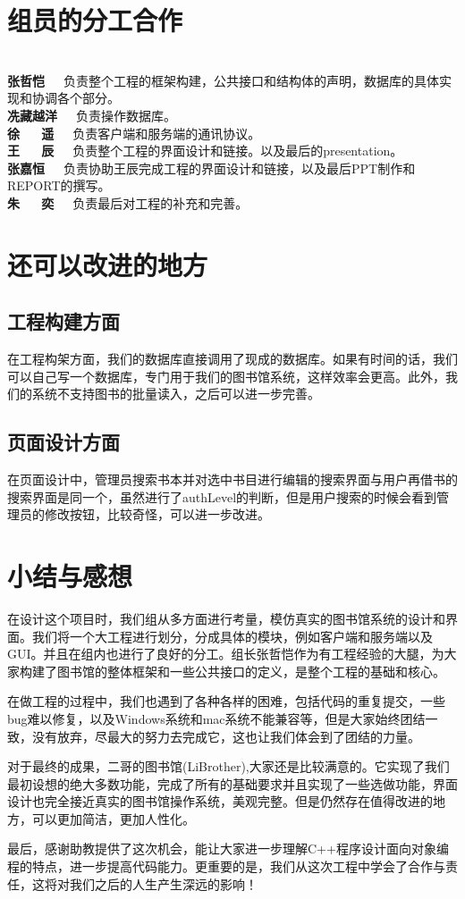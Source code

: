 \documentclass[UTF8]{ctexart}
\begin{document}
\section{组员的分工合作}
\\
\textbf{张哲恺}~~~负责整个工程的框架构建，公共接口和结构体的声明，数据库的具体实现和协调各个部分。\\
\textbf{冼藏越洋}~~~负责操作数据库。\\
\textbf{徐~~~遥}~~~负责客户端和服务端的通讯协议。\\
\textbf{王~~~辰}~~~负责整个工程的界面设计和链接。以及最后的presentation。\\
\textbf{张嘉恒}~~~负责协助王辰完成工程的界面设计和链接，以及最后PPT制作和REPORT的撰写。\\
\textbf{朱~~~奕}~~~负责最后对工程的补充和完善。\\
\section{还可以改进的地方}
\subsection{工程构建方面}
在工程构架方面，我们的数据库直接调用了现成的数据库。如果有时间的话，我们可以自己写一个数据库，专门用于我们的图书馆系统，这样效率会更高。此外，我们的系统不支持图书的批量读入，之后可以进一步完善。
\subsection{页面设计方面}
在页面设计中，管理员搜索书本并对选中书目进行编辑的搜索界面与用户再借书的搜索界面是同一个，虽然进行了authLevel的判断，但是用户搜索的时候会看到管理员的修改按钮，比较奇怪，可以进一步改进。
\section{小结与感想}
在设计这个项目时，我们组从多方面进行考量，模仿真实的图书馆系统的设计和界面。我们将一个大工程进行划分，分成具体的模块，例如客户端和服务端以及GUI。并且在组内也进行了良好的分工。组长张哲恺作为有工程经验的大腿，为大家构建了图书馆的整体框架和一些公共接口的定义，是整个工程的基础和核心。

在做工程的过程中，我们也遇到了各种各样的困难，包括代码的重复提交，一些bug难以修复，以及Windows系统和mac系统不能兼容等，但是大家始终团结一致，没有放弃，尽最大的努力去完成它，这也让我们体会到了团结的力量。

对于最终的成果，二哥的图书馆(LiBrother),大家还是比较满意的。它实现了我们最初设想的绝大多数功能，完成了所有的基础要求并且实现了一些选做功能，界面设计也完全接近真实的图书馆操作系统，美观完整。但是仍然存在值得改进的地方，可以更加简洁，更加人性化。

最后，感谢助教提供了这次机会，能让大家进一步理解C++程序设计面向对象编程的特点，进一步提高代码能力。更重要的是，我们从这次工程中学会了合作与责任，这将对我们之后的人生产生深远的影响！
\end{document}
